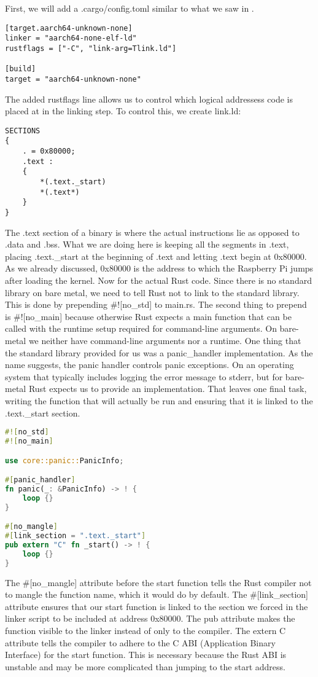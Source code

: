First, we will add a .cargo/config.toml similar to what we saw in .
\begin{lstlisting}
[target.aarch64-unknown-none]
linker = "aarch64-none-elf-ld"
rustflags = ["-C", "link-arg=Tlink.ld"]
    
[build]
target = "aarch64-unknown-none"
\end{lstlisting}
The added rustflags line allows us to control which logical addressess code is placed at in the linking step.
To control this, we create link.ld:
\begin{lstlisting}
SECTIONS
{
    . = 0x80000;
    .text :
    {
        *(.text._start)
        *(.text*)
    }
}
\end{lstlisting}
The .text section of a binary is where the actual instructions lie as opposed to .data and .bss.
What we are doing here is keeping all the segments in .text, placing .text.\_start at the beginning of .text and letting .text begin at 0x80000.
As we already discussed, 0x80000 is the address to which the Raspberry Pi jumps after loading the kernel.
Now for the actual Rust code. Since there is no standard library on bare metal, we need to tell Rust not to link to the standard library.
This is done by prepending \#![no\_std] to main.rs.
The second thing to prepend is \#![no\_main] because otherwise Rust expects a main function that can be called with the runtime setup required for command-line arguments.
On bare-metal we neither have command-line arguments nor a runtime.
One thing that the standard library provided for us was a panic\_handler implementation.
As the name suggests, the panic handler controls panic exceptions.
On an operating system that typically includes logging the error message to stderr, but for bare-metal Rust expects us to provide an implementation.
That leaves one final task, writing the function that will actually be run and ensuring that it is linked to the .text.\_start section.
\begin{lstlisting}[language=Rust,style=colouredRust]
#![no_std]
#![no_main]

use core::panic::PanicInfo;

#[panic_handler]
fn panic(_: &PanicInfo) -> ! {
    loop {}
}

#[no_mangle]
#[link_section = ".text._start"]
pub extern "C" fn _start() -> ! {
	loop {}
}
\end{lstlisting}

The \#[no\_mangle] attribute before the start function tells the Rust compiler not to mangle the function name, which it would do by default.
The \#[link\_section] attribute ensures that our start function is linked to the section we forced in the linker script to be included at address 0x80000.
The pub attribute makes the function visible to the linker instead of only to the compiler.
The extern C attribute tells the compiler to adhere to the C ABI (Application Binary Interface) for the start function.
This is necessary because the Rust ABI is unstable and may be more complicated than jumping to the start address.

